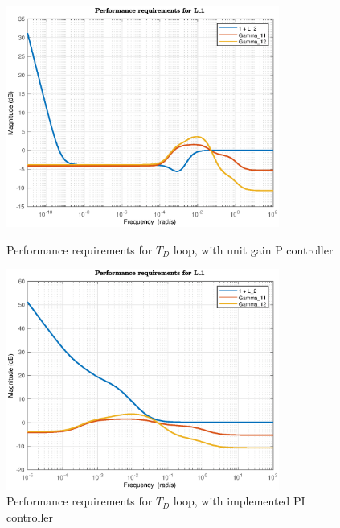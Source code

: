 \documentclass[12pt]{article}
\begin{document}
\begin{figure}[p]
\centering
\includegraphics[width=0.8\textwidth]{../Systemanalyse/Log_Data_to_Matlab/Figurer/LV_identifisering/L1_krav_P-reg.eps}
\caption{Performance requirements for $T_D$ loop, with unit gain P controller}
\label{fig:L1_performance1}

\includegraphics[width=0.8\textwidth]{../Systemanalyse/Log_Data_to_Matlab/Figurer/LV_identifisering/L1_krav_PI-reg.eps}
\caption{Performance requirements for $T_D$ loop, with implemented PI controller}
\label{fig:L1_performance2}
\end{figure}
\end{document}
